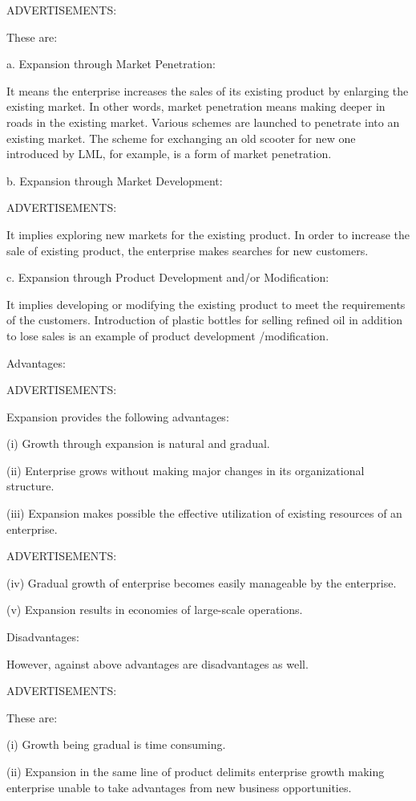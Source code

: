 \documentclass{article}
\begin{document}
ADVERTISEMENTS:

These are:

a. Expansion through Market Penetration:

It means the enterprise increases the sales of its existing product by enlarging the existing market. In other words, market
 penetration means making deeper in roads in the existing market. Various schemes are launched to penetrate into an existing market. The scheme for exchanging an old scooter for new one introduced by LML, for example, is a form of market penetration.

b. Expansion through Market Development:

ADVERTISEMENTS:

It implies exploring new markets for the existing product. In order to increase the sale of existing product, the enterprise
 makes searches for new customers.

c. Expansion through Product Development and/or Modification:

It implies developing or modifying the existing product to meet the requirements of the customers. Introduction of plastic bottles
 for selling refined oil in addition to lose sales is an example of product development /modification.

Advantages:

ADVERTISEMENTS:

Expansion provides the following advantages:

(i) Growth through expansion is natural and gradual.

(ii) Enterprise grows without making major changes in its organizational structure.

(iii) Expansion makes possible the effective utilization of existing resources of an enterprise.

ADVERTISEMENTS:

(iv) Gradual growth of enterprise becomes easily manageable by the enterprise.

(v) Expansion results in economies of large-scale operations.

Disadvantages:

However, against above advantages are disadvantages as well.

ADVERTISEMENTS:

These are:

(i) Growth being gradual is time consuming.

(ii) Expansion in the same line of product delimits enterprise growth making enterprise unable to take advantages from new business 
opportunities.
\end{document}
